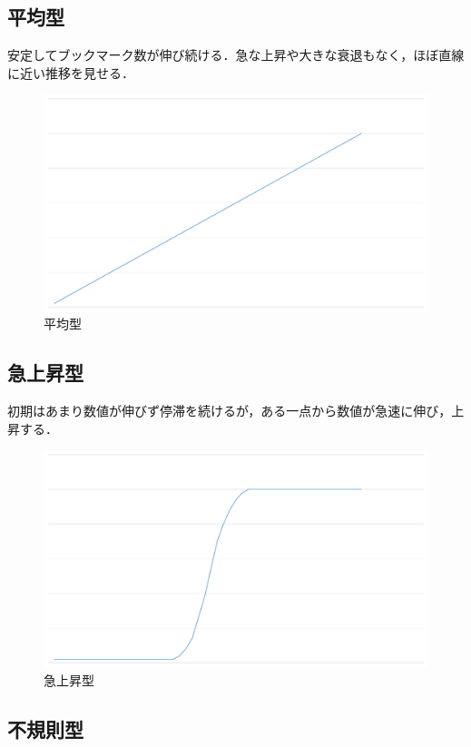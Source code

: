 \subsection{平均型}
安定してブックマーク数が伸び続ける．急な上昇や大きな衰退もなく，ほぼ直線に近い推移を見せる．

\begin{figure}[htb]
\centering
\includegraphics[width=13cm]{g1.pdf}
\caption{平均型}\label{g1}
\end{figure}

\subsection{急上昇型}
初期はあまり数値が伸びず停滞を続けるが，ある一点から数値が急速に伸び，上昇する．

\begin{figure}[htb]
\centering
\includegraphics[width=13cm]{g2.pdf}
\caption{急上昇型}\label{g2}
\end{figure}

\newpage

\subsection{不規則型}

